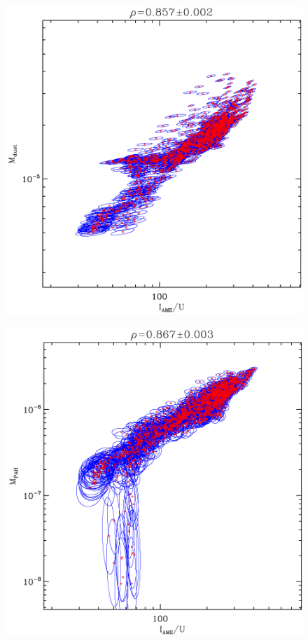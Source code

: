     \begin{figure}

      \includegraphics[width=\textwidth/2]{../Plots/ch_lori/fred_LOri_notes_Oct2017_fig2a.pdf}
      \centering
      \caption{ }
      \label{fig:fred_LOri_notes_Oct2017_fig2a}
    \end{figure}

    \begin{figure}
      \includegraphics[width=\textwidth/2]{../Plots/ch_lori/fred_LOri_notes_Oct2017_fig2b.pdf}
      \centering
      \caption{ }
      \label{fig:fred_LOri_notes_Oct2017_fig2b}
    \end{figure}


